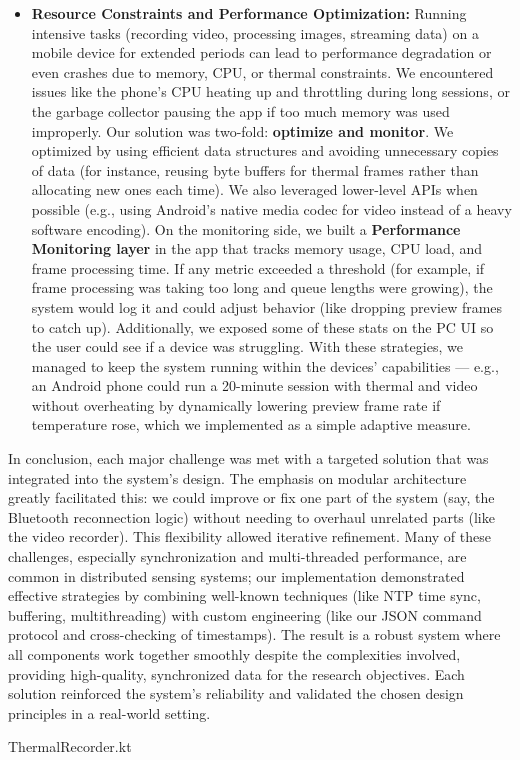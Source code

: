 \begin{itemize}
\item \textbf{Resource Constraints and Performance Optimization:} Running
  intensive tasks (recording video, processing images, streaming data)
  on a mobile device for extended periods can lead to performance
  degradation or even crashes due to memory, CPU, or thermal
  constraints. We encountered issues like the phone's CPU heating up and
  throttling during long sessions, or the garbage collector pausing the
  app if too much memory was used improperly. Our solution was two-fold:
  \textbf{optimize and monitor}. We optimized by using efficient data
  structures and avoiding unnecessary copies of data (for instance,
  reusing byte buffers for thermal frames rather than allocating new
  ones each time). We also leveraged lower-level APIs when possible
  (e.g., using Android's native media codec for video instead of a heavy
  software encoding). On the monitoring side, we built a \textbf{Performance
  Monitoring layer} in the app that tracks memory usage, CPU load, and
  frame processing
  time\cite{DeviceServer}.
  If any metric exceeded a threshold (for example, if frame processing
  was taking too long and queue lengths were growing), the system would
  log it and could adjust behavior (like dropping preview frames to
  catch up). Additionally, we exposed some of these stats on the PC UI
  so the user could see if a device was struggling. With these
  strategies, we managed to keep the system running within the devices'
  capabilities --- e.g., an Android phone could run a 20-minute session
  with thermal and video without overheating by dynamically lowering
  preview frame rate if temperature rose, which we implemented as a
  simple adaptive measure.

\end{itemize}
In conclusion, each major challenge was met with a targeted solution
that was integrated into the system's design. The emphasis on modular
architecture greatly facilitated this: we could improve or fix one part
of the system (say, the Bluetooth reconnection logic) without needing to
overhaul unrelated parts (like the video recorder). This flexibility
allowed iterative refinement. Many of these challenges, especially
synchronization and multi-threaded performance, are common in
distributed sensing systems; our implementation demonstrated effective
strategies by combining well-known techniques (like NTP time sync,
buffering, multithreading) with custom engineering (like our JSON
command protocol and cross-checking of timestamps). The result is a
robust system where all components work together smoothly despite the
complexities involved, providing high-quality, synchronized data for the
research objectives. Each solution reinforced the system's reliability
and validated the chosen design principles in a real-world setting.





ThermalRecorder.kt
